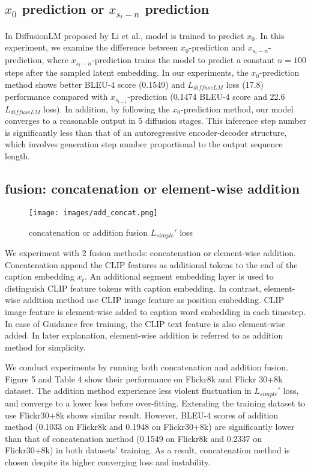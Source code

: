 \documentclass{article}
\begin{document}
\subsection{$x_0$ prediction or $x_{s_t-n}$ prediction}
\label{sec:x0-exp}
In DiffusionLM proposed by Li et al.\cite{diffuselm}, model is trained to predict $x_0$. In this experiment, we examine the difference between $x_0$-prediction and $x_{s_t-n}$-prediction, where $x_{s_t-n}$-prediction trains the model to predict a constant $n = 100$ steps after the sampled latent embedding. In our experiments, the $x_0$-prediction method shows better BLEU-4 score (0.1549) and $L_{diffuseLM}$ loss (17.8) performance compared with $x_{s_{t-1}}$-prediction (0.1474 BLEU-4 score and 22.6 $L_{diffuseLM}$ loss). In addition, by following the $x_0$-prediction method, our model converges to a reasonable output in 5 diffusion stages. This inference step number is significantly less than that of an autoregressive encoder-decoder structure, which involves generation step number proportional to the output sequence length.

\subsection{fusion: concatenation or element-wise addition}
\label{sec:fusion-exp}
\begin{figure}
  \centering
  \texttt{[image: images/add\_concat.png]}
  \caption{concatenation or addition fusion $L_{simple}'$ loss}
  \label{fig:fusion}
\end{figure}

We experiment with 2 fusion methods: concatenation or element-wise addition. Concatenation append the CLIP features as additional tokens to the end of the caption embedding $x_t$. An additional segment embedding layer is used to distinguish CLIP feature tokens with caption embedding. In contrast, element-wise addition method use CLIP image feature as position embedding. CLIP image feature is element-wise added to caption word embedding in each timestep. In case of Guidance free training, the CLIP text feature is also element-wise added. In later explanation, element-wise addition is referred to as addition method for simplicity.

We conduct experiments by running both concatenation and addition fusion. Figure 5 and Table 4 show their performance on Flickr8k and Flickr 30+8k dataset. The addition method experience less violent fluctuation in $L_{simple}'$ loss, and converge to a lower loss before over-fitting. Extending the training dataset to use Flickr30+8k shows similar result. However, BLEU-4 scores of addition method (0.1033 on Flickr8k and 0.1948 on Flickr30+8k) are significantly lower than that of concatenation method (0.1549 on Flickr8k and 0.2337 on Flickr30+8k) in both datasets' training. As a result, concatenation method is chosen despite its higher converging loss and instability. 
\end{document}
